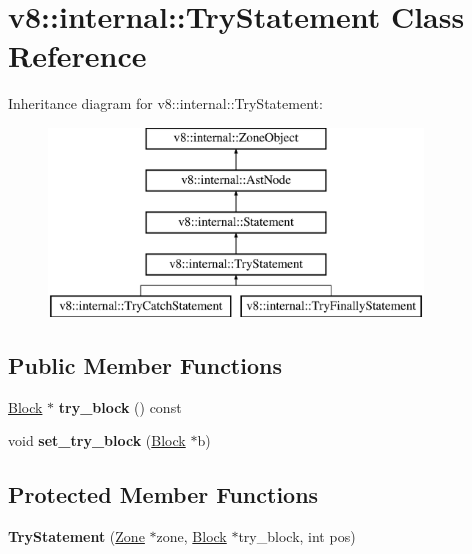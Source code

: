 \hypertarget{classv8_1_1internal_1_1_try_statement}{}\section{v8\+:\+:internal\+:\+:Try\+Statement Class Reference}
\label{classv8_1_1internal_1_1_try_statement}
Inheritance diagram for v8\+:\+:internal\+:\+:Try\+Statement\+:\begin{figure}[H]
\begin{center}
\leavevmode
\includegraphics[height=5.000000cm]{classv8_1_1internal_1_1_try_statement}
\end{center}
\end{figure}
\subsection*{Public Member Functions}
\begin{DoxyCompactItemize}
\item 
\hyperlink{classv8_1_1internal_1_1_block}{Block} $\ast$ {\bfseries try\+\_\+block} () const \hypertarget{classv8_1_1internal_1_1_try_statement_aeed2f3df112e0d9a8c7638dc3d656d23}{}\label{classv8_1_1internal_1_1_try_statement_aeed2f3df112e0d9a8c7638dc3d656d23}

\item 
void {\bfseries set\+\_\+try\+\_\+block} (\hyperlink{classv8_1_1internal_1_1_block}{Block} $\ast$b)\hypertarget{classv8_1_1internal_1_1_try_statement_a49611afe2e591ab3589e58d02651d182}{}\label{classv8_1_1internal_1_1_try_statement_a49611afe2e591ab3589e58d02651d182}

\end{DoxyCompactItemize}
\subsection*{Protected Member Functions}
\begin{DoxyCompactItemize}
\item 
{\bfseries Try\+Statement} (\hyperlink{classv8_1_1internal_1_1_zone}{Zone} $\ast$zone, \hyperlink{classv8_1_1internal_1_1_block}{Block} $\ast$try\+\_\+block, int pos)\hypertarget{classv8_1_1internal_1_1_try_statement_a6c6cac17ee9a252e39980e3b804f463f}{}\label{classv8_1_1internal_1_1_try_statement_a6c6cac17ee9a252e39980e3b804f463f}

\end{DoxyCompactItemize}
